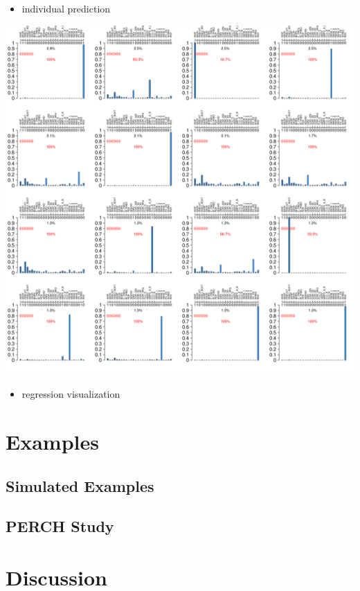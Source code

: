 \documentclass[article]{jss}
\begin{document}
\begin{itemize}
\itemsep1pt\parskip0pt
\item
  individual prediction
\end{itemize}

\includegraphics{./figures/02GAM_individual_diagnosis.pdf}

\begin{itemize}
\itemsep1pt\parskip0pt
\item
  regression visualization
\end{itemize}

\section{Examples}\label{examples}

\subsection{Simulated Examples}\label{simulated-examples}

\subsection{PERCH Study}\label{perch-study}

\section{Discussion}\label{discussion}
\end{document}
